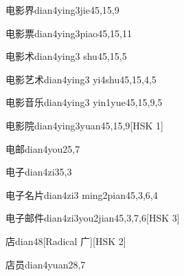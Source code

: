 \begin{entry}{电影界}{dian4ying3jie4}{5,15,9}
\end{entry}

\begin{entry}{电影票}{dian4ying3piao4}{5,15,11}
\end{entry}

\begin{entry}{电影术}{dian4ying3 shu4}{5,15,5}
\end{entry}

\begin{entry}{电影艺术}{dian4ying3 yi4shu4}{5,15,4,5}
\end{entry}

\begin{entry}{电影音乐}{dian4ying3 yin1yue4}{5,15,9,5}
\end{entry}

\begin{entry}{电影院}{dian4ying3yuan4}{5,15,9}[HSK 1]
\end{entry}

\begin{entry}{电邮}{dian4you2}{5,7}
\end{entry}

\begin{entry}{电子}{dian4zi3}{5,3}
\end{entry}

\begin{entry}{电子名片}{dian4zi3 ming2pian4}{5,3,6,4}
\end{entry}

\begin{entry}{电子邮件}{dian4zi3you2jian4}{5,3,7,6}[HSK 3]
\end{entry}

\begin{entry}{店}{dian4}{8}[Radical 广][HSK 2]
\end{entry}

\begin{entry}{店员}{dian4yuan2}{8,7}
\end{entry}

